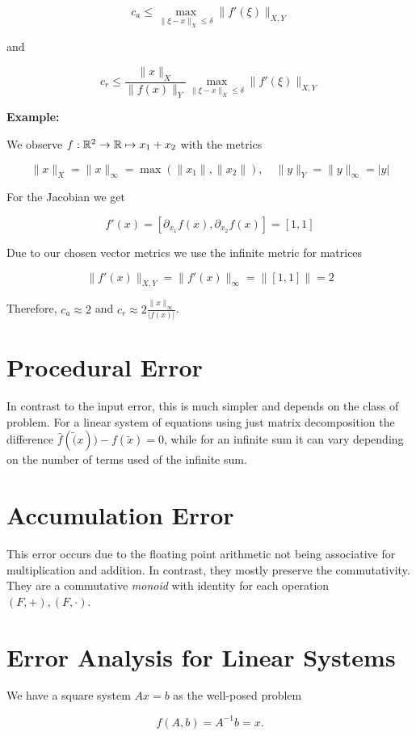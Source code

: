 \[
    c_a \le \max_{\|\xi - x\|_X \le \delta} \|f'(\xi)\|_{X,Y}
\]

and 

\[
    c_r \le \frac{\|x\|_X}{\|f(x)\|_Y}\max_{\|\xi - x\|_X \le \delta} \|f'(\xi)\|_{X,Y}
\]

\textbf{Example:}

We observe \(f: \mathbb{R}^2 \to \mathbb{R} \mapsto x_1 + x_2\) with the metrics 

\[
    \|x\|_X = \|x\|_{\infty} = \max(\|x_1\|, \|x_2\|), \quad \|y\|_Y = \|y\|_{\infty} = |y|
\]

For the Jacobian we get 

\[
    f'(x) = [\partial_{x_1} f(x), \partial_{x_2} f(x)] = [1, 1]
\]

Due to our chosen vector metrics we use the infinite metric for matrices 

\[
    \|f'(x)\|_{X,Y} = \|f'(x)\|_{\infty} = \|[1, 1]\| = 2
\]

Therefore, \(c_a \approx 2\) and \(c_r \approx 2 \frac{\|x\|_{\infty}}{|f(x)|}\).

\section{Procedural Error}

In contrast to the input error, this is much simpler and depends on the class of problem. For a linear system 
of equations using just matrix decomposition the difference \(\hat{f}(\tilde(x)) - f(\tilde{x}) = 0\), while for 
an infinite sum it can vary depending on the number of terms used of the infinite sum.

\section{Accumulation Error}

This error occurs due to the floating point arithmetic not being associative for multiplication and addition. In contrast, 
they mostly preserve the commutativity. They are a commutative \emph{monoid} with identity for each operation \((F, +), (F, \cdot)\).


\section{Error Analysis for Linear Systems}

We have a square system \(Ax = b\) as the well-posed problem 

\[
    f(A, b) = A^{-1} b = x.
\]

